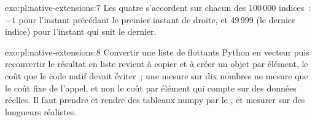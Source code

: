 \begin{solution}{exo:pl:native-extensions:7}
Les quatre s'accordent sur chacun des 100\,000 indices~: $-1$ pour l'instant précédant le premier instant de droite, et 49\,999 (le dernier indice) pour
l'instant qui suit le dernier.
\end{solution}

\begin{solution}{exo:pl:native-extensions:8}
Convertir une liste de flottants Python en vecteur puis reconvertir le résultat en liste revient à copier et à créer un objet par élément, le coût que le code natif devait éviter~;
une mesure sur dix nombres ne mesure que le coût fixe de l'appel, et non le coût par élément qui compte sur des données réelles. Il faut
prendre et rendre des tableaux numpy par le , et mesurer sur des longueurs réalistes.
\end{solution}

